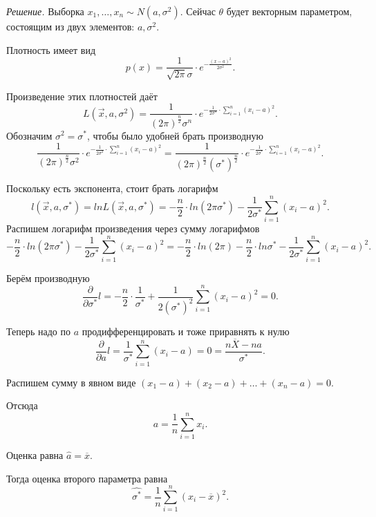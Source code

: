 \textit{Решение.} Выборка $x_1, \dotsc, x_n \sim N \left( a, \sigma^2 \right) $.
Сейчас $ \theta $ будет векторным параметром, состоящим из двух элементов: $a, \sigma^2$.

Плотность имеет вид
$$p \left( x \right) =
  \frac{1}{ \sqrt{2 \pi } \sigma } \cdot e^{- \frac{ \left( x - a \right)^2}{2 \sigma^2}}.$$

Произведение этих плотностей даёт
$$L \left( \vec{x}, a, \sigma^2 \right) =
  \frac{1}{ \left( 2 \pi \right)^{ \frac{n}{2}} \sigma^n}
  \cdot e^{- \frac{1}{2 \sigma^n} \cdot \sum \limits_{i = 1}^n \left( x_i - a \right)^2}.$$
Обозначим $ \sigma^2 = \sigma^*$, чтобы было удобней брать производную
$$ \frac{1}{ \left( 2 \pi \right)^{ \frac{n}{2}} \sigma^2}
  \cdot e^{- \frac{1}{2 \sigma^2} \cdot \sum \limits_{i = 1}^n \left( x_i - a \right)^2} =
  \frac{1}{ \left( 2 \pi \right)^{ \frac{n}{2}} \left( \sigma^* \right)^{ \frac{n}{2}}} \cdot
  e^{- \frac{1}{2 \sigma^*} \cdot \sum \limits_{i = 1}^n \left( x_i - a \right)^2}.$$

Поскольку есть экспонента, стоит брать логарифм
$$l \left( \vec{x}, a, \sigma^* \right) =
  ln L \left( \vec{x}, a, \sigma^* \right) =
  - \frac{n}{2} \cdot ln \left( 2 \pi \sigma^* \right) -
  \frac{1}{2 \sigma^*} \sum \limits_{i = 1}^n \left( x_i - a \right)^2.$$
Распишем логарифм произведения через сумму логарифмов
$$- \frac{n}{2} \cdot ln \left( 2 \pi \sigma^* \right) -
  \frac{1}{2 \sigma^*} \sum \limits_{i = 1}^n \left( x_i - a \right)^2 =
  - \frac{n}{2} \cdot ln \left( 2 \pi \right) -
  \frac{n}{2} \cdot ln \sigma^* -
  \frac{1}{2 \sigma^*} \sum \limits_{i = 1}^n \left( x_i - a \right)^2.$$

Берём производную
$$ \frac{ \partial }{ \partial \sigma^*} l =
  - \frac{n}{2} \cdot \frac{1}{ \sigma^*} +
  \frac{1}{2 \left( \sigma^* \right)^2} \sum \limits_{i = 1}^n \left( x_i - a \right)^2 =
  0.$$

Теперь надо по $a$ продифференцировать и тоже приравнять к нулю
$$ \frac{ \partial }{ \partial a} l =
  \frac{1}{ \sigma^*} \sum \limits_{i = 1}^n \left( x_i - a \right) =
  0 =
  \frac{n \overline{X} - na}{ \sigma^*}.$$

Распишем сумму в явном виде
$ \left( x_1 - a \right) + \left( x_2 - a \right) + \dotsc + \left( x_n - a \right) =
  0$.

Отсюда
$$a =
  \frac{1}{n} \sum \limits_{i = 1}^n x_i.$$

Оценка равна $ \hat{a} = \overline{x}.$

Тогда оценка второго параметра равна
$$ \hat{ \sigma^*} =
  \frac{1}{n} \sum \limits_{i = 1}^n \left( x_i - \overline{x} \right)^2.$$

